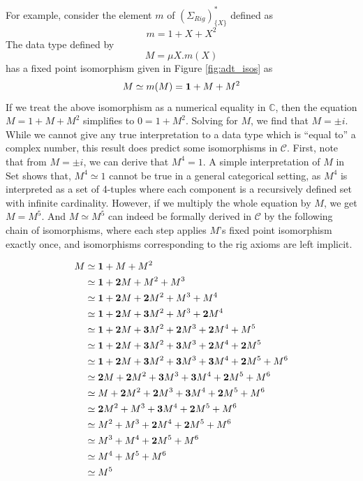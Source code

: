 \documentclass{msthesis}
\theoremstyle{definition}
\newcommand{\mbC}{\mathbb{C}}
\newcommand{\mcC}{\mathcal{C}}
\newcommand{\Set}{\ensuremath{\mathrm{Set}}}
\begin{document}
For example, consider the element $m$ of $(\Sigma_{Rig})^*_{\{X\}}$ defined as
\[ m = 1 + X + X^2 \]
The data type defined by
\[ M = \mu X.m(X) \]
has a fixed point isomorphism given in Figure \ref{fig:adt_isos} as
\[ M \simeq m(M) = \mathbf{1} + M + M^2\]
If we treat the above isomorphism as a numerical equality in $\mbC$, then the equation $M = 1 + M + M^2$ simplifies to $0 = 1 + M^2$.  Solving for $M$, we find that $M = \pm i$.  While we cannot give any true interpretation to a data type which is ``equal to'' a complex number, this result does predict some isomorphisms in $\mcC$.  First, note that from $M = \pm i$, we can derive that $M^4 = 1$.  A simple interpretation of $M$ in $\Set$ shows that, $M^4 \simeq 1$ cannot be true in a general categorical setting, as $M^4$ is interpreted as a set of 4-tuples where each component is a recursively defined set with infinite cardinality.  However, if we multiply the whole equation by $M$, we get $M=M^5$.  And $M\simeq M^5$ can indeed be formally derived in $\mcC$ by the following chain of isomorphisms, where each step applies $M$'s fixed point isomorphism exactly once, and isomorphisms corresponding to the rig axioms are left implicit.

\begin{align*}
    M &\simeq \mathbf{1} + M + M^2 \\
    &\simeq \mathbf{1} + \mathbf{2}M + M^2 + M^3 \\
    &\simeq \mathbf{1} + \mathbf{2}M + \mathbf{2}M^2 + M^3 + M^4 \\
    &\simeq \mathbf{1} + \mathbf{2}M + \mathbf{3}M^2 + M^3 + \mathbf{2}M^4 \\
    &\simeq \mathbf{1} + \mathbf{2}M + \mathbf{3}M^2 + \mathbf{2}M^3 + \mathbf{2}M^4 + M^5 \\
    &\simeq \mathbf{1} + \mathbf{2}M + \mathbf{3}M^2 + \mathbf{3}M^3 + \mathbf{2}M^4 + \mathbf{2}M^5 \\
    &\simeq \mathbf{1} + \mathbf{2}M + \mathbf{3}M^2 + \mathbf{3}M^3 + \mathbf{3}M^4 + \mathbf{2}M^5 + M^6 \\
    &\simeq \mathbf{2}M + \mathbf{2}M^2 + \mathbf{3}M^3 + \mathbf{3}M^4 + \mathbf{2}M^5 + M^6 \\
    &\simeq M + \mathbf{2}M^2 + \mathbf{2}M^3 + \mathbf{3}M^4 + \mathbf{2}M^5 + M^6 \\
    &\simeq \mathbf{2}M^2 + M^3 + \mathbf{3}M^4 + \mathbf{2}M^5 + M^6 \\
    &\simeq M^2 + M^3 + \mathbf{2}M^4 + \mathbf{2}M^5 + M^6 \\
    &\simeq M^3 + M^4 + \mathbf{2}M^5 + M^6 \\
    &\simeq M^4 + M^5 + M^6 \\
    &\simeq M^5
\end{align*}
\end{document}
